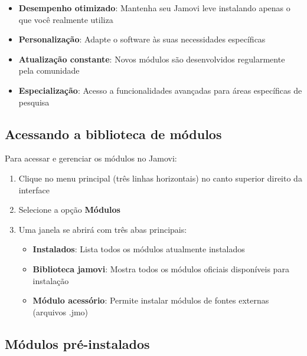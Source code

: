 \begin{itemize}
    \item \textbf{Desempenho otimizado}: Mantenha seu Jamovi leve instalando apenas o que você realmente utiliza
    \item \textbf{Personalização}: Adapte o software às suas necessidades específicas
    \item \textbf{Atualização constante}: Novos módulos são desenvolvidos regularmente pela comunidade
    \item \textbf{Especialização}: Acesso a funcionalidades avançadas para áreas específicas de pesquisa
\end{itemize}

\subsection{Acessando a biblioteca de módulos}

Para acessar e gerenciar os módulos no Jamovi:

\begin{enumerate}
    \item Clique no menu principal (três linhas horizontais) no canto superior direito da interface
    \item Selecione a opção \textbf{Módulos}
    \item Uma janela se abrirá com três abas principais:
    \begin{itemize}
        \item \textbf{Instalados}: Lista todos os módulos atualmente instalados
        \item \textbf{Biblioteca jamovi}: Mostra todos os módulos oficiais disponíveis para instalação
        \item \textbf{Módulo acessório}: Permite instalar módulos de fontes externas (arquivos .jmo)
    \end{itemize}
\end{enumerate}


\subsection{Módulos pré-instalados}

